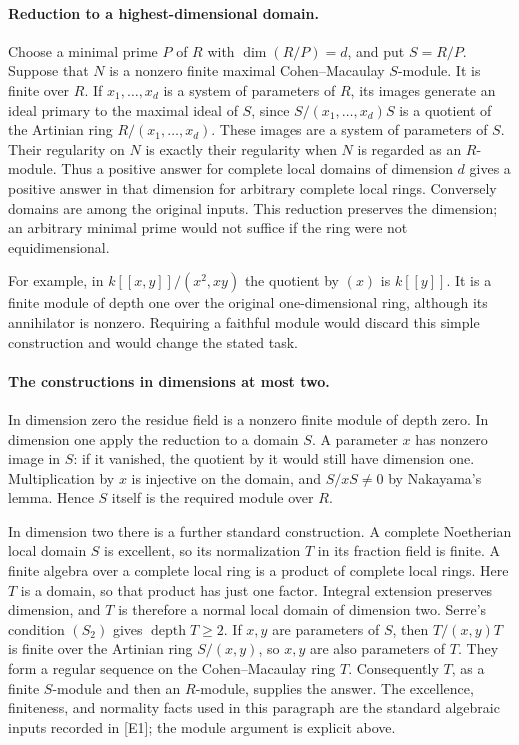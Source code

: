 \documentclass[11pt]{article}
\begin{document}
\paragraph{Reduction to a highest-dimensional domain.}
Choose a minimal prime $P$ of $R$ with $\dim(R/P)=d$, and put $S=R/P$.
Suppose that $N$ is a nonzero finite maximal Cohen--Macaulay $S$-module.
It is finite over $R$. If $x_1,\ldots,x_d$ is a system of parameters of
$R$, its images generate an ideal primary to the maximal ideal of $S$,
since $S/(x_1,\ldots,x_d)S$ is a quotient of the Artinian ring
$R/(x_1,\ldots,x_d)$. These images are a system of parameters of $S$.
Their regularity on $N$ is exactly their regularity when $N$ is regarded
as an $R$-module. Thus a positive answer for complete local domains of
dimension $d$ gives a positive answer in that dimension for arbitrary
complete local rings. Conversely domains are among the original inputs.
This reduction preserves the dimension; an arbitrary minimal prime would
not suffice if the ring were not equidimensional.

For example, in $k[[x,y]]/(x^2,xy)$ the quotient by $(x)$ is $k[[y]]$.
It is a finite module of depth one over the original one-dimensional
ring, although its annihilator is nonzero. Requiring a faithful module
would discard this simple construction and would change the stated task.

\paragraph{The constructions in dimensions at most two.}
In dimension zero the residue field is a nonzero finite module of depth
zero. In dimension one apply the reduction to a domain $S$. A parameter
$x$ has nonzero image in $S$: if it vanished, the quotient by it would
still have dimension one. Multiplication by $x$ is injective on the
domain, and $S/xS\ne0$ by Nakayama's lemma. Hence $S$ itself is the
required module over $R$.

In dimension two there is a further standard construction. A complete
Noetherian local domain $S$ is excellent, so its normalization $T$ in its
fraction field is finite. A finite algebra over a complete local ring is
a product of complete local rings. Here $T$ is a domain, so that product
has just one factor. Integral extension preserves dimension, and $T$ is
therefore a normal local domain of dimension two. Serre's condition
$(S_2)$ gives $\operatorname{depth}T\ge2$. If $x,y$ are parameters of
$S$, then $T/(x,y)T$ is finite over the Artinian ring $S/(x,y)$, so
$x,y$ are also parameters of $T$. They form a regular sequence on the
Cohen--Macaulay ring $T$. Consequently $T$, as a finite $S$-module and
then an $R$-module, supplies the answer. The excellence, finiteness, and
normality facts used in this paragraph are the standard algebraic inputs
recorded in [E1]; the module argument is explicit above.
\end{document}
